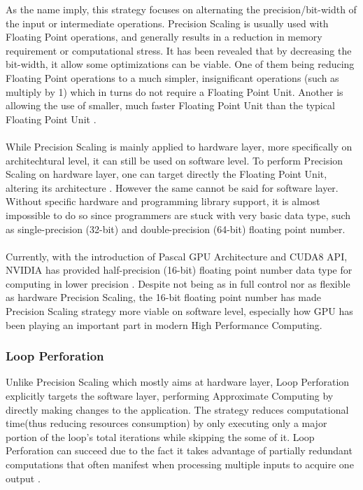 As the name imply, this strategy focuses on alternating the precision/bit-width of the input or intermediate operations. Precision Scaling is usually used with Floating Point operations, and generally results in a reduction in memory requirement or computational stress. It has been revealed that by decreasing the bit-width, it allow some optimizations can be viable. One of them being reducing Floating Point operations to a much simpler, insignificant operations (such as multiply by 1) which in turns do not require a Floating Point Unit. Another is allowing the use of smaller, much faster Floating Point Unit than the typical Floating Point Unit \cite{4408271}. \\
~\\
While Precision Scaling is mainly applied to hardware layer, more specifically on architechtural level, it can still be used on software level. To perform Precision Scaling on hardware layer, one can target directly the Floating Point Unit, altering its architecture \cite{AxCSurvey}. However the same cannot be said for software layer. Without specific hardware and programming library support, it is almost impossible to do so since programmers are stuck with very basic data type, such as single-precision (32-bit) and double-precision (64-bit) floating point number. \\
~\\
Currently, with the introduction of Pascal GPU Architecture and CUDA8 API, NVIDIA has provided half-precision (16-bit) floating point number data type for computing in lower precision \cite{CUDA8}. Despite not being as in full control nor as flexible as hardware Precision Scaling, the 16-bit floating point number has made Precision Scaling strategy more viable on software level, especially how GPU has been playing an important part in modern High Performance Computing. \\

\subsubsection{Loop Perforation}

Unlike Precision Scaling which mostly aims at hardware layer, Loop Perforation explicitly targets the software layer, performing Approximate Computing by directly making changes to the application. The strategy reduces computational time(thus reducing resources consumption) by only executing only a major portion of the loop's total iterations while skipping the some of it. Loop Perforation can succeed due to the fact it takes advantage of partially redundant computations that often manifest when processing multiple inputs to acquire one output \cite{LoopPerforation}. \\

